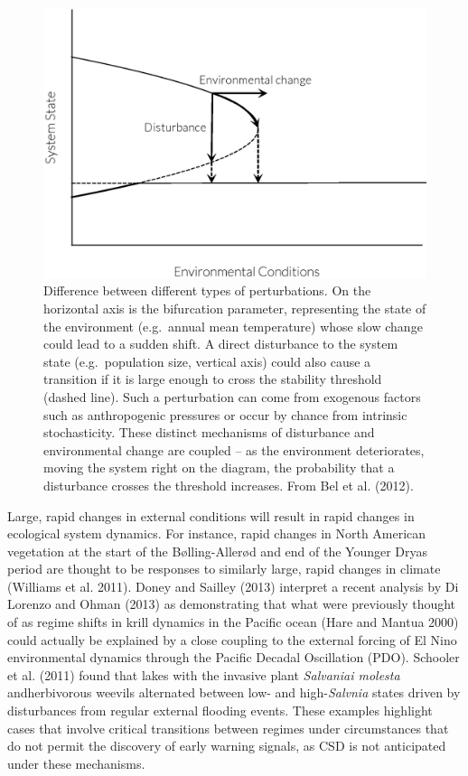 \documentclass{article}
\begin{document}
\begin{figure}[htbp]
\centering
\includegraphics{Bel2012example.eps}
\caption{Difference between different types of perturbations. On the
horizontal axis is the bifurcation parameter, representing the state of
the environment (e.g.~annual mean temperature) whose slow change could
lead to a sudden shift. A direct disturbance to the system state
(e.g.~population size, vertical axis) could also cause a transition if
it is large enough to cross the stability threshold (dashed line). Such
a perturbation can come from exogenous factors such as anthropogenic
pressures or occur by chance from intrinsic stochasticity. These
distinct mechanisms of disturbance and environmental change are coupled
-- as the environment deteriorates, moving the system right on the
diagram, the probability that a disturbance crosses the threshold
increases. From Bel et al. (2012).}
\end{figure}

Large, rapid changes in external conditions will result in rapid changes
in ecological system dynamics. For instance, rapid changes in North
American vegetation at the start of the Bølling-Allerød and end of the
Younger Dryas period are thought to be responses to similarly large,
rapid changes in climate (Williams et al. 2011). Doney and Sailley
(2013) interpret a recent analysis by Di Lorenzo and Ohman (2013) as
demonstrating that what were previously thought of as regime shifts in
krill dynamics in the Pacific ocean (Hare and Mantua 2000) could
actually be explained by a close coupling to the external forcing of El
Nino environmental dynamics through the Pacific Decadal Oscillation
(PDO). Schooler et al. (2011) found that lakes with the invasive plant
\emph{Salvaniai molesta} andherbivorous weevils alternated between low-
and high-\emph{Salvnia} states driven by disturbances from regular
external flooding events. These examples highlight cases that involve
critical transitions between regimes under circumstances that do not
permit the discovery of early warning signals, as CSD is not anticipated
under these mechanisms.
\end{document}
